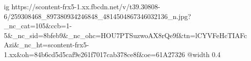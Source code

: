  
 
 
 
 

\ifcmt
  ig https://scontent-frx5-1.xx.fbcdn.net/v/t39.30808-6/259308468_897380934246848_4814504867346032136_n.jpg?_nc_cat=105&ccb=1-5&_nc_sid=8bfeb9&_nc_ohc=HOU7PTSuzwoAX8rQe9f&tn=lCYVFeHcTIAFcAzi&_nc_ht=scontent-frx5-1.xx&oh=84b6cd5d5caf9e261f7017cab378ce8f&oe=61A27326
  @width 0.4
\fi
